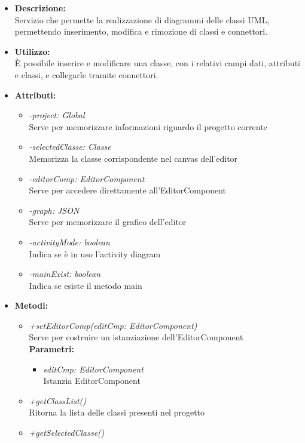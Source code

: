 \begin{itemize}
	\item \textbf{Descrizione:}\\
	Servizio che permette la realizzazione di diagrammi delle classi UML, permettendo inserimento, modifica e rimozione di classi e connettori.
	\item \textbf{Utilizzo:}\\
	È possibile inserire e modificare una classe, con i relativi campi dati, attributi e classi, e collegarle tramite connettori.
	\item \textbf{Attributi:}
		\begin{itemize}
			\item \emph{-project: Global}\\
			Serve per memorizzare informazioni riguardo il progetto corrente
			\item \emph{-selectedClasse: Classe}\\
			Memorizza la classe corrispondente nel canvas dell'editor
			\item \emph{-editorComp: EditorComponent}\\
			Serve per accedere direttamente all'EditorComponent
			\item \emph{-graph: JSON}\\
			Serve per memorizzare il grafico dell'editor
			\item \emph{-activityMode: boolean}\\
			Indica se è in uso l'activity diagram
			\item \emph{-mainExist: boolean}\\
			Indica se esiste il metodo main
		\end{itemize}
	\item \textbf{Metodi:}
		\begin{itemize}
			\item \emph{+setEditorComp(editCmp: EditorComponent)}\\
    		Serve per costruire un istanziazione dell'EditorComponent\\
    		\textbf{Parametri:}
    		\begin{itemize}
    			\item \emph{editCmp: EditorComponent}\\
    			Istanzia EditorComponent
    		\end{itemize}
    		\item \emph{+getClassList()}\\
    		Ritorna la lista delle classi presenti nel progetto
    		\item \emph{+getSelectedClasse()}\\

\end{itemize}
\end{itemize}
